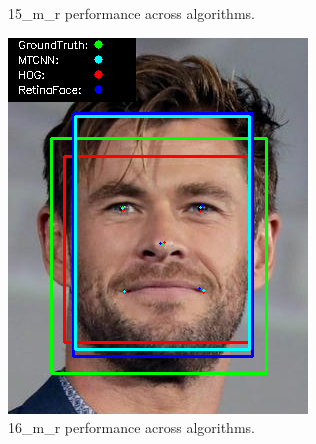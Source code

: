 \documentclass{l4proj}
\begin{document}
\begin{appendices}
\begin{figure}[h!]
\begin{minipage}{0.49\textwidth}
    \caption{15\_m\_r performance across algorithms.}
    \label{whoopi_result}
  \end{minipage}
\end{figure}

\begin{figure}[h!]
  \centering
  \begin{minipage}{0.49\textwidth}
    \centering
     \includegraphics[width=\textwidth]{images/appendix/16.png}
    \caption{16\_m\_r performance across algorithms.}
    \label{whoopi_result}
  \end{minipage}
    \hfill
    \begin{minipage}{0.49\textwidth}
    \centering

\end{minipage}
\end{figure}
\end{appendices}
\end{document}
